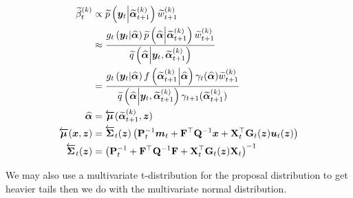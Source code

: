 \documentclass[notitlepage]{article}
\renewcommand{\vec}[1]{\bm{#1}}
\newcommand{\vecLarrow}[1]{\overleftarrow{\vec{#1}}}
\newcommand{\mat}[1]{\mathbf{#1}}
\newcommand{\matLarrow}[1]{\overleftarrow{\mat{#1}}}
\newcommand{\Lparen}[1]{\left( #1\right)}
\newcommand{\Cond}[2]{ #1 \middle\vert  #2}
\newcommand{\optor}[2]{#1\Lparen{#2}}
\newcommand{\optorC}[3]{\optor{#1}{\Cond{#2}{#3}}}
\newcommand{\pdenstC}[2]{\optorC{\widetilde p}{#1}{#2}}
\newcommand{\IDAproxC}[2]{\optorC{\widetilde{q}}{#1}{#2}}
\newcommand{\particB}[3]{\widetilde{#1}_{#2}^{\Lparen{#3}}}
\begin{document}
\begin{align}
\particB{\beta}{t}{k} &\propto %
		\pdenstC{\vec{y}_t}{\particB{\vec\alpha}{t + 1}k}
		\particB w{t + 1}k\nonumber\\
	&\approx \frac{ %
		\optorC{g_t}{\vec{y}_t}{\widehat{\vec\alpha}}
		\pdenstC{\widehat{\vec\alpha}}{\particB{\vec{\alpha}}{t + 1}k}
		\particB w{t + 1}k
	}{%
		\IDAproxC{\widehat{\vec\alpha}}{\vec y_t, 
			\particB{\vec{\alpha}}{t + 1}k}
	}\nonumber\\
&= \frac{ %
		\optorC{g_t}{\vec{y}_t}{\widehat{\vec\alpha}}
		\optorC{f}{\particB{\vec{\alpha}}{t + 1}k}{\widehat{\vec\alpha}}
		\gamma_t(\widehat{\vec\alpha})
		\particB w{t + 1}k
	}{%
		\IDAproxC{\widehat{\vec\alpha}}{\vec y_t, 
			\particB{\vec{\alpha}}{t + 1}k}
		\gamma_{t+1}(\particB{\vec{\alpha}}{t + 1}k)
	}\label{eq:bwResampleW}\\
\widehat{\vec\alpha} &= 
	\vecLarrow\mu (\particB{\vec{\alpha}}{t + 1}k, \vec z)\nonumber\\
\vecLarrow\mu (\vec x, \vec z)
	&= \matLarrow\Sigma_t(\vec z)\Lparen{
	\mat P_t^{-1}\vec m_t + \mat F^\top \mat Q^{-1}\vec x + 
	\mat X_t^\top\mat G_t(\vec z)\vec u_t(\vec z)} \label{eq:bwPropBackMean}\\
\matLarrow\Sigma_t(\vec z) &= 
	\Lparen{\mat P_t^{-1} + \mat F^\top\mat Q^{-1}\mat F + 
		\mat X_t^\top \mat G_t(\vec z) \mat X_t}^{-1} \label{eq:bwPropBackCov} 
\end{align}

We may also use a multivariate t-distribution for the proposal distribution to get heavier
tails then we do with the multivariate normal distribution.
\end{document}
